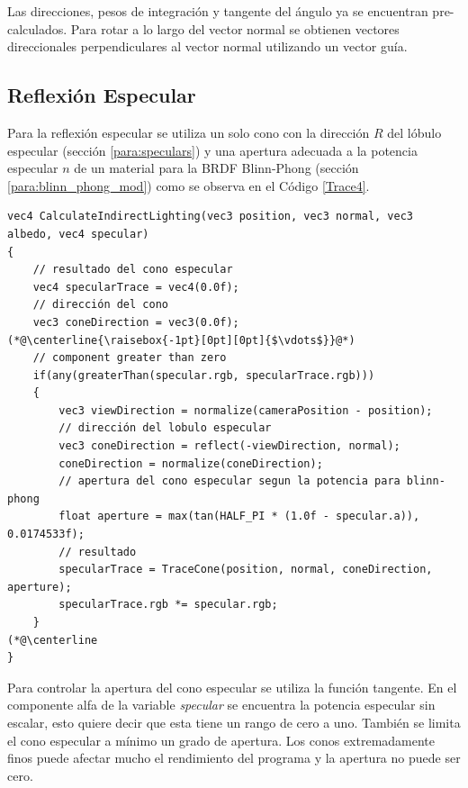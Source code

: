Las direcciones, pesos de integración y tangente del ángulo ya se encuentran pre-calculados. Para rotar a lo largo del vector normal se obtienen vectores direccionales perpendiculares al vector normal utilizando un vector guía.
\subsection{Reflexión Especular} %
\label{sub:reflexion_especular}
Para la reflexión especular se utiliza un solo cono con la dirección $R$ del lóbulo especular (sección \ref{para:speculars}) y una apertura adecuada a la potencia especular $n$ de un material para la \ac{BRDF} Blinn-Phong (sección \ref{para:blinn_phong_mod}) como se observa en el Código \ref{Trace4}.
\\
\begin{lstlisting}[caption={Cono para reflexión especular.}, label=Trace4]
vec4 CalculateIndirectLighting(vec3 position, vec3 normal, vec3 albedo, vec4 specular)
{
    // resultado del cono especular
    vec4 specularTrace = vec4(0.0f);
    // dirección del cono
    vec3 coneDirection = vec3(0.0f);
(*@\centerline{\raisebox{-1pt}[0pt][0pt]{$\vdots$}}@*)
    // component greater than zero
    if(any(greaterThan(specular.rgb, specularTrace.rgb)))
    {
        vec3 viewDirection = normalize(cameraPosition - position);
        // dirección del lobulo especular
        vec3 coneDirection = reflect(-viewDirection, normal);
        coneDirection = normalize(coneDirection);
        // apertura del cono especular segun la potencia para blinn-phong
        float aperture = max(tan(HALF_PI * (1.0f - specular.a)), 0.0174533f);
        // resultado
        specularTrace = TraceCone(position, normal, coneDirection, aperture);
        specularTrace.rgb *= specular.rgb;
    }
(*@\centerline
}
\end{lstlisting}

Para controlar la apertura del cono especular se utiliza la función tangente. En el componente alfa de la variable \emph{specular} se encuentra la potencia especular sin escalar, esto quiere decir que esta tiene un rango de cero a uno. También se limita el cono especular a mínimo un grado de apertura. Los conos extremadamente finos puede afectar mucho el rendimiento del programa y la apertura no puede ser cero.
